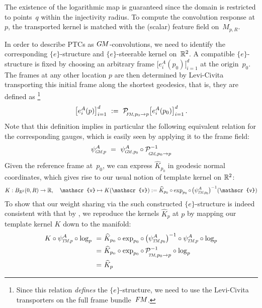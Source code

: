 The existence of the logarithmic map is guaranteed since the domain is restricted to points~$q$ within the injectivity radius.
To compute the convolution response at $p$, the transported kernel is matched with the (scalar) feature field on~$M_{p,R}$.


In order to describe PTCs as $G\mkern-1.4muM$-convolutions, we need to identify the corresponding $\{e\}$-structure and $\{e\}$-steerable kernel on~$\mathbb{R}^2$.
A compatible $\{e\}$-structure is fixed by choosing an arbitrary frame $\big[e^A_i(p_0)\big]_{i=1}^d$ at the \mbox{origin}~$p_0$.
The frames at any other location $p$ are then determined by Levi-Civita transporting this initial frame along the shortest geodesics, that is, they are defined as%
\footnote{
    Since this relation \emph{defines} the $\{e\}$-structure, we need to use the Levi-Civita transporters on the full frame bundle~$F\mkern-1.5muM$.
}
\begin{align}
    \big[e^A_i(p) \big]_{i=1}^d\ :=\ 
    \mathcal{P}_{\mkern-2mu\overset{}{\protect\scalebox{.6}{$\!F\!M$}\mkern-2mu,\mkern1mu p_0\to p}}
    \big[e^A_i(p_0)\big]_{i=1}^d \,.
\end{align}
Note that this definition implies in particular the following equivalent relation for the corresponding gauges, which is easily seen by applying it to the frame field:
\begin{align}\label{eq:PTC_e-structure_gauges}
    \psiGMp^A
    \ =\ 
    \psi_{\protect\scalebox{.6}{$G\!M,\mkern2mu$}\protect\scalebox{.7}{$p_0$}}^A
    \circ
    \mathcal{P}_{\mkern-2mu\overset{}{\protect\scalebox{.6}{$\!G\!M$}\mkern-2mu,\mkern1mu p_0\to p}}^{-1}
\end{align}
Given the reference frame at~$p_0$, we can express $\widehat{K}_{p_0}$ in geodesic normal coordinates, which gives rise to our usual notion of template kernel on $\mathbb{R}^2$:
\begin{align}\label{eq:PTCs_kernel_lift_R2}
    K: B_{\R^2}(0,R) \to \R,
    \quad \mathscr{v} \mapsto K(\mathscr{v}) :=
    \widehat{K}_{p_0} \circ \exp_{p_0} \circ\mkern2mu
    \big( \psi_{\protect\scalebox{.6}{$T\!M,$}\protect\scalebox{.7}{$p_0$}}^A \big)^{-1} (\mathscr{v})
\end{align}
To show that our weight sharing via the such constructed $\{e\}$-structure is indeed consistent with that by \citet{schonsheck2018parallel}, we reproduce the kernels $\widehat{K}_p$ at $p$ by mapping our template kernel $K$ down to the manifold:
\begin{align}
    K \circ \psiTMp^A \circ \log_p
    \ =&\ \widehat{K}_{p_0} \circ \exp_{p_0} \circ\,
        \big( \psi_{\protect\scalebox{.6}{$T\!M,$}\protect\scalebox{.7}{$p_0$}}^A \big)^{-1}
        \circ \psiTMp^A \circ \log_p \notag \\
    \ =&\ \widehat{K}_{p_0} \circ \exp_{p_0} \circ\,
        \mathcal{P}_{\mkern-2mu\overset{}{\protect\scalebox{.6}{$\!T\!M$}\mkern-2mu,\mkern1mu p_0\to p}}^{-1}
        \circ \log_p \notag \\
    \ =&\ \widehat{K}_p
\end{align}
